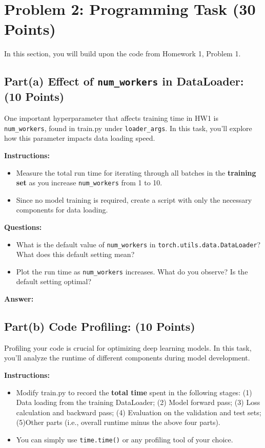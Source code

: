 \documentclass[11pt, oneside]{article}   	%
\begin{document}
\section*{Problem 2: Programming Task (30 Points)}
In this section, you will build upon the code from Homework 1, Problem 1.

\subsection*{Part(a) Effect of \texttt{num\_workers} in DataLoader: (10 Points)}
One important hyperparameter that affects training time in HW1 is \texttt{num\_workers}, found in train.py under \texttt{loader\_args}. In this task, you’ll explore how this parameter impacts data loading speed.

\textbf{Instructions:}
\begin{itemize}
    \item Measure the total run time for iterating through all batches in the \textbf{training set} as you increase \texttt{num\_workers} from 1 to 10.
    \item Since no model training is required, create a script with only the necessary components for data loading.
\end{itemize}

\textbf{Questions:}
\begin{itemize}
    \item What is the default value of \texttt{num\_workers} in \texttt{torch.utils.data.DataLoader}? What does this default setting mean?
    \item Plot the run time as \texttt{num\_workers} increases. What do you observe? Is the default setting optimal?
\end{itemize}

\textbf{Answer:}



\subsection*{Part(b) Code Profiling: (10 Points)}
Profiling your code is crucial for optimizing deep learning models. In this task, you’ll analyze the runtime of different components during model development.

\textbf{Instructions:}
\begin{itemize}
    \item Modify train.py to record the \textbf{total time} spent in the following stages: (1) Data loading from the training DataLoader; (2) Model forward pass; (3) Loss calculation and backward pass; (4) Evaluation on the validation and test sets; (5)Other parts (i.e., overall runtime minus the above four parts).
    \item You can simply use \texttt{time.time()} or any profiling tool of your choice.
\end{itemize}
\end{document}
